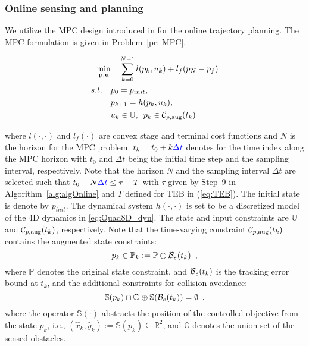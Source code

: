 \subsubsection{Online sensing and planning}
%
We utilize the MPC design introduced in \cite{Zhang2017} for the online trajectory planning. The MPC formulation is given in Problem~\ref{pr: MPC}.
%
\begin{problem}\label{pr: MPC}
\begin{align*}
\min_{\mathbf{p},\mathbf{u}}  & \quad \sum^{N-1}_{k=0} l(p_k,u_k) + l_f(p_N-p_f)  \\
s.t. \quad & p_0 = p_{init},\\
&p_{k+1} = h(p_k,u_k),\\
& u_k \in \mathbb{U},\enspace p_k \in \mathcal C_{p,\text{aug}}(t_k) 
\end{align*}
\end{problem}
%
where $l(\cdot,\cdot)$ and $l_f(\cdot)$ are convex stage and terminal cost functions and $N$ is the horizon for the MPC problem. $t_k = t_0 + k \textcolor{blue}{\Delta t}$ denotes for the time index along the MPC horizon with $t_0$ and $\Delta t$ being the initial time step and the sampling interval, respectively. Note that the horizon $N$ and the sampling interval $\Delta t$ are selected such that $t_0 + N \textcolor{blue}{\Delta t}\leq \tau - T$ with $\tau$ given by Step~9 in Algorithm~\ref{alg:algOnline} and $T$ defined for TEB in (\ref{eq:TEB}). The initial state is denote by $p_{init}$. The dynamical system $h(\cdot,\cdot)$ is set to be a discretized model of the 4D dynamics in \eqref{eq:Quad8D_dyn}. The state and input constraints are $\mathbb{U}$ and $\mathcal C_{p,\text{aug}}(t_k)$, respectively. Note that the time-varying constraint $\mathcal C_{p,\text{aug}}(t_k)$ contains the augmented state constraints:
%
\begin{equation}
p_k \in \mathbb{P}_k :=\mathbb{P}\ominus\mathcal B_e(t_k) \enspace ,
\end{equation}
%
where $\mathbb{P}$ denotes the original state constraint, and $\mathcal B_e(t_k)$ is the tracking error bound at $t_k$, and the additional constraints for collision avoidance:
%
\begin{equation}
\mathbb{S}(p_k)\cap\mathbb{O}\oplus\mathbb{S}(\mathcal B_e(t_k)) = \emptyset \enspace ,
\end{equation}
%
where the operator $\mathbb{S}(\cdot)$ abstracts the position of the controlled objective from the state $p_k$, i.e., $(\hat x_k,\hat y_k) := \mathbb{S}(p_k)\subseteq \mathbb{R}^{2}$, and $\mathbb{O}$ denotes the union set of the sensed obstacles.
